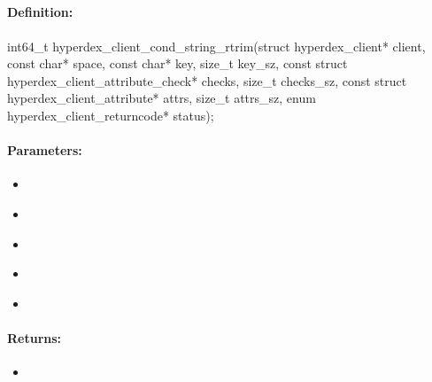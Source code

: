 \pagebreak
\subsection{}
\label{api:c:cond_string_rtrim}


\paragraph{Definition:}
\begin{ccode}
int64_t hyperdex_client_cond_string_rtrim(struct hyperdex_client* client,
        const char* space,
        const char* key, size_t key_sz,
        const struct hyperdex_client_attribute_check* checks, size_t checks_sz,
        const struct hyperdex_client_attribute* attrs, size_t attrs_sz,
        enum hyperdex_client_returncode* status);
\end{ccode}

\paragraph{Parameters:}
\begin{itemize}[noitemsep]
\item {}\\

\item {}\\

\item {}\\

\item {}\\

\item {}\\

\end{itemize}

\paragraph{Returns:}
\begin{itemize}[noitemsep]
\item {}\\

\end{itemize}

